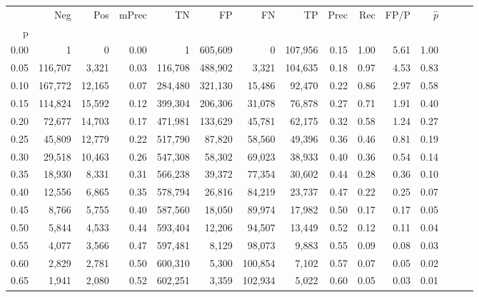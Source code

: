 \begin{tabular}{rrrrrrrrrrrrrrr}
\toprule
{} &      Neg &     Pos & mPrec &       TN &       FP &       FN &       TP &  Prec &   Rec &  FP/P & $\hat{p}$ \\
p    &          &         &       &          &          &          &          &       &       &       &           \\
\midrule
0.00 &        1 &       0 &  0.00 &        1 &  605,609 &        0 &  107,956 &  0.15 &  1.00 &  5.61 &      1.00 \\
0.05 &  116,707 &   3,321 &  0.03 &  116,708 &  488,902 &    3,321 &  104,635 &  0.18 &  0.97 &  4.53 &      0.83 \\
0.10 &  167,772 &  12,165 &  0.07 &  284,480 &  321,130 &   15,486 &   92,470 &  0.22 &  0.86 &  2.97 &      0.58 \\
0.15 &  114,824 &  15,592 &  0.12 &  399,304 &  206,306 &   31,078 &   76,878 &  0.27 &  0.71 &  1.91 &      0.40 \\
0.20 &   72,677 &  14,703 &  0.17 &  471,981 &  133,629 &   45,781 &   62,175 &  0.32 &  0.58 &  1.24 &      0.27 \\
0.25 &   45,809 &  12,779 &  0.22 &  517,790 &   87,820 &   58,560 &   49,396 &  0.36 &  0.46 &  0.81 &      0.19 \\
0.30 &   29,518 &  10,463 &  0.26 &  547,308 &   58,302 &   69,023 &   38,933 &  0.40 &  0.36 &  0.54 &      0.14 \\
0.35 &   18,930 &   8,331 &  0.31 &  566,238 &   39,372 &   77,354 &   30,602 &  0.44 &  0.28 &  0.36 &      0.10 \\
0.40 &   12,556 &   6,865 &  0.35 &  578,794 &   26,816 &   84,219 &   23,737 &  0.47 &  0.22 &  0.25 &      0.07 \\
0.45 &    8,766 &   5,755 &  0.40 &  587,560 &   18,050 &   89,974 &   17,982 &  0.50 &  0.17 &  0.17 &      0.05 \\
0.50 &    5,844 &   4,533 &  0.44 &  593,404 &   12,206 &   94,507 &   13,449 &  0.52 &  0.12 &  0.11 &      0.04 \\
0.55 &    4,077 &   3,566 &  0.47 &  597,481 &    8,129 &   98,073 &    9,883 &  0.55 &  0.09 &  0.08 &      0.03 \\
0.60 &    2,829 &   2,781 &  0.50 &  600,310 &    5,300 &  100,854 &    7,102 &  0.57 &  0.07 &  0.05 &      0.02 \\
0.65 &    1,941 &   2,080 &  0.52 &  602,251 &    3,359 &  102,934 &    5,022 &  0.60 &  0.05 &  0.03 &      0.01 \\

\end{tabular}
